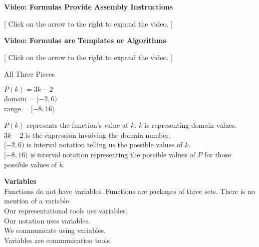 \documentclass{ximera}
\begin{document}
\begin{explanation} \textbf{Video: Formulas Provide Assembly Instructions}

[ Click on the arrow to the right to expand the video. ]
\begin{expandable} 

\begin{center}
\end{center}

\end{expandable}
\end{explanation}




\begin{explanation} \textbf{Video: Formulas are Templates or Algorithms}

[ Click on the arrow to the right to expand the video. ]
\begin{expandable} 

\begin{center}
\end{center}

\end{expandable}
\end{explanation}








\begin{example}   All Three Pieces 

$P(k) = 3k - 2$ \\
domain = $[-2, 6)$ \\
range = $[-8, 16)$


$P(k)$ represents the function's value at $k$.  $k$ is representing domain values. $3k - 2$ is the expression involving the domain number. \\

$[-2, 6)$ is interval notation telling us the possible values of $k$. \\

$[-8, 16)$ is interval notation representing the possible values of $P$ for those possible values of $k$.  


\end{example}




\begin{warning} \textbf{\textcolor{red!70!darkgray}{Variables}}    \\

Functions do not have variables.  Functions are packages of three sets.  There is no mention of a variable. \\

Our representational tools use variables. \\

Our notation uses variables. \\

We communicate using variables.  \\

Variables are communication tools. 

\end{warning}
\end{document}

